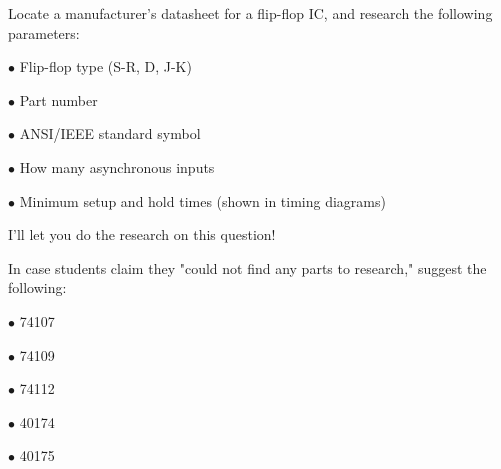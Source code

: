 

Locate a manufacturer's datasheet for a flip-flop IC, and research the following parameters:

\medskip
\item{$\bullet$} Flip-flop type (S-R, D, J-K)
\item{$\bullet$} Part number
\item{$\bullet$} ANSI/IEEE standard symbol
\item{$\bullet$} How many asynchronous inputs
\item{$\bullet$} Minimum setup and hold times (shown in timing diagrams)
\medskip







I'll let you do the research on this question!







In case students claim they "could not find any parts to research," suggest the following:

\medskip
\goodbreak
\item{$\bullet$} 74107
\item{$\bullet$} 74109
\item{$\bullet$} 74112
\item{$\bullet$} 40174
\item{$\bullet$} 40175
\medskip





